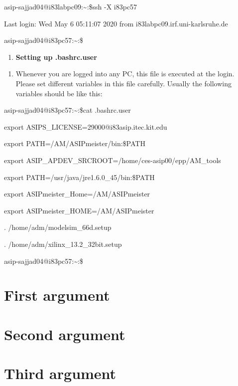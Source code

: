 \documentclass{article}
\begin{document}
asip-sajjad04@i83labpc09:\textasciitilde:\$ssh -X i83pc57

Last login: Wed May 6 05:11:07 2020 from i83labpc09.irf.uni-karlsruhe.de

asip-sajjad04@i83pc57:\textasciitilde:\$

\begin{enumerate}
\def\labelenumi{\Alph{enumi}.}
\setcounter{enumi}{9}
\item
  \textbf{Setting up .bashrc.user}
\end{enumerate}

\begin{enumerate}
\def\labelenumi{\arabic{enumi}.}
\setcounter{enumi}{12}
\item
  Whenever you are logged into any PC, this file is executed at the
  login. Please set different variables in this file carefully. Usually
  the following variables should be like this:
\end{enumerate}

asip-sajjad04@i83pc57:\textasciitilde:\$cat .bashrc.user

export ASIPS\_LICENSE=29000@i83asip.itec.kit.edu

export PATH=/AM/ASIPmeister/bin:\$PATH

export ASIP\_APDEV\_SRCROOT=/home/ces-asip00/epp/AM\_tools

export PATH=/usr/java/jre1.6.0\_45/bin:\$PATH

export ASIPmeister\_Home=/AM/ASIPmeister

export ASIPmeister\_HOME=/AM/ASIPmeister

. /home/adm/modelsim\_66d.setup

. /home/adm/xilinx\_13.2\_32bit.setup

asip-sajjad04@i83pc57:\textasciitilde:\$
\section{First argument}

\section{Second argument}

\section{Third argument}


\printbibliography
\printindex
\end{document}
